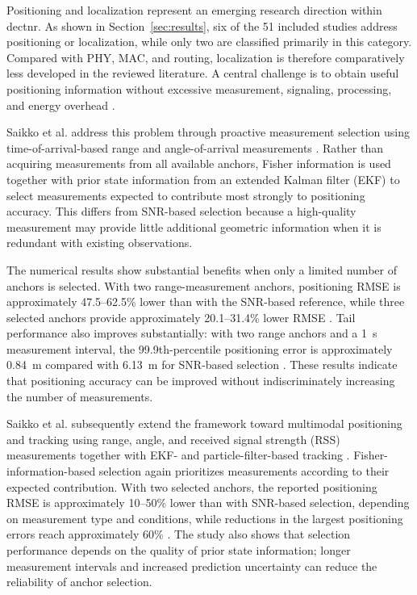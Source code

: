 Positioning and localization represent an emerging research direction within
\gls{dectnr}. As shown in Section~\ref{sec:results}, six of the 51 included
studies address positioning or localization, while only two are classified
primarily in this category. Compared with PHY, MAC, and routing, localization
is therefore comparatively less developed in the reviewed literature. A
central challenge is to obtain useful positioning information without
excessive measurement, signaling, processing, and energy overhead
\cite{saikkoPositioningDECT2020NR2024,
saikkoPositioningTrackingDECT20202025}.

Saikko et al. address this problem through proactive measurement selection
using time-of-arrival-based range and angle-of-arrival measurements
\cite{saikkoPositioningDECT2020NR2024}. Rather than acquiring measurements
from all available anchors, Fisher information is used together with prior
state information from an extended Kalman filter (EKF) to select measurements
expected to contribute most strongly to positioning accuracy. This differs
from SNR-based selection because a high-quality measurement may provide little
additional geometric information when it is redundant with existing
observations.

The numerical results show substantial benefits when only a limited number of
anchors is selected. With two range-measurement anchors, positioning RMSE is
approximately 47.5--62.5\% lower than with the SNR-based reference, while
three selected anchors provide approximately 20.1--31.4\% lower RMSE
\cite{saikkoPositioningDECT2020NR2024}. Tail performance also improves
substantially: with two range anchors and a 1~s measurement interval, the
99.9th-percentile positioning error is approximately 0.84~m compared with
6.13~m for SNR-based selection
\cite{saikkoPositioningDECT2020NR2024}. These results indicate that
positioning accuracy can be improved without indiscriminately increasing the
number of measurements.

Saikko et al. subsequently extend the framework toward multimodal positioning
and tracking using range, angle, and received signal strength (RSS)
measurements together with EKF- and particle-filter-based tracking
\cite{saikkoPositioningTrackingDECT20202025}. Fisher-information-based
selection again prioritizes measurements according to their expected
contribution. With two selected anchors, the reported positioning RMSE is
approximately 10--50\% lower than with SNR-based selection, depending on
measurement type and conditions, while reductions in the largest positioning
errors reach approximately 60\%
\cite{saikkoPositioningTrackingDECT20202025}. The study also shows that
selection performance depends on the quality of prior state information;
longer measurement intervals and increased prediction uncertainty can reduce
the reliability of anchor selection.

